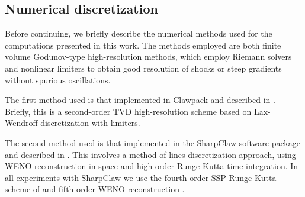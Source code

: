 \subsection{Numerical discretization\label{discretization}}
Before continuing, we briefly describe the numerical methods used for the
computations presented in this work.  The methods employed are both
finite volume Godunov-type
high-resolution methods, which employ Riemann solvers and nonlinear limiters
to obtain good resolution of shocks or steep gradients without spurious
oscillations.  

The first method used is that implemented in Clawpack \cite{clawpack45}
and described in \cite{leveque1997}.  Briefly, this is a second-order TVD
high-resolution scheme based on Lax-Wendroff discretization with limiters.

The second method used is that implemented in the SharpClaw software package
\cite{sharpclaw} and described in \cite{ketcheson2006,ketcheson2011}.  
This involves a method-of-lines
discretization approach, using WENO reconstruction in space and high order
Runge-Kutta time integration.  In all experiments with SharpClaw we use the
fourth-order SSP Runge-Kutta scheme of \cite{ketcheson2008} and fifth-order 
WENO reconstruction \cite{shu2009}.
